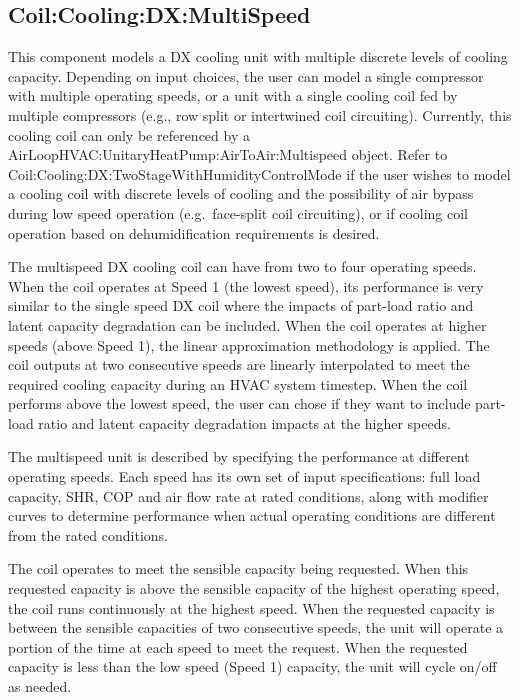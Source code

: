 \subsection{Coil:Cooling:DX:MultiSpeed}\label{coilcoolingdxmultispeed}

This component models a DX cooling unit with multiple discrete levels of cooling capacity. Depending on input choices, the user can model a single compressor with multiple operating speeds, or a unit with a single cooling coil fed by multiple compressors (e.g., row split or intertwined coil circuiting). Currently, this cooling coil can only be referenced by a AirLoopHVAC:UnitaryHeatPump:AirToAir:Multispeed object. Refer to Coil:Cooling:DX:TwoStageWithHumidityControlMode if the user wishes to model a cooling coil with discrete levels of cooling and the possibility of air bypass during low speed operation (e.g.~face-split coil circuiting), or if cooling coil operation based on dehumidification requirements is desired.

The multispeed DX cooling coil can have from two to four operating speeds. When the coil operates at Speed 1 (the lowest speed), its performance is very similar to the single speed DX coil where the impacts of part-load ratio and latent capacity degradation can be included. When the coil operates at higher speeds (above Speed 1), the linear approximation methodology is applied. The coil outputs at two consecutive speeds are linearly interpolated to meet the required cooling capacity during an HVAC system timestep. When the coil performs above the lowest speed, the user can chose if they want to include part-load ratio and latent capacity degradation impacts at the higher speeds.

The multispeed unit is described by specifying the performance at different operating speeds. Each speed has its own set of input specifications: full load capacity, SHR, COP and air flow rate at rated conditions, along with modifier curves to determine performance when actual operating conditions are different from the rated conditions.

The coil operates to meet the sensible capacity being requested. When this requested capacity is above the sensible capacity of the highest operating speed, the coil runs continuously at the highest speed. When the requested capacity is between the sensible capacities of two consecutive speeds, the unit will operate a portion of the time at each speed to meet the request. When the requested capacity is less than the low speed (Speed 1) capacity, the unit will cycle on/off as needed.

